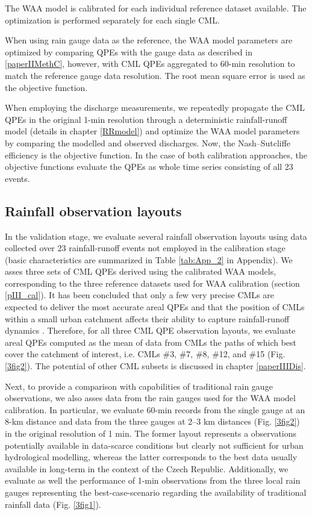 \documentclass{ctuthesis}\usepackage[]{graphicx}\usepackage[]{color}
\begin{document}
The WAA model is calibrated for each individual reference dataset available. The optimization is performed separately for each single CML. 

When using rain gauge data as the reference, the WAA model parameters are optimized by comparing QPEs with the gauge data as described in \ref{paperIIMethC}, however, with CML QPEs aggregated to 60-min resolution to match the reference gauge data resolution. The root mean square error is used as the objective function. 

When employing the discharge measurements, we repeatedly propagate the CML QPEs in the original 1-min resolution through a deterministic rainfall-runoff model (details in chapter \ref{RRmodel}) and optimize the WAA model parameters by comparing the modelled and observed discharges. Now, the Nash–Sutcliffe efficiency is the objective function. In the case of both calibration approaches, the objective functions evaluate the QPEs as whole time series consisting of all 23 events.


\subsection{Rainfall observation layouts} \label{pIII_rainfall_scen}

In the validation stage, we evaluate several rainfall observation layouts using data collected over 23 rainfall-runoff events not employed in the calibration stage (basic characteristics are summarized in Table \ref{tab:App_2} in Appendix). We asses three sets of CML QPEs derived using the calibrated WAA models, corresponding to the three reference datasets used for WAA calibration (section \ref{pIII_cal}). It has been concluded that only a few very precise CMLs are expected to deliver the most accurate areal QPEs \citep{fenclCommercialMicrowaveLinks2015} and that the position of CMLs within a small urban catchment affects their ability to capture rainfall-runoff dynamics \citep[][chapter \ref{chap5}]{pastorekCommercialMicrowaveLinks2019}. Therefore, for all three CML QPE observation layouts, we evaluate areal QPEs computed as the mean of data from CMLs the paths of which best cover the catchment of interest, i.e. CMLs \#3, \#7, \#8, \#12, and \#15 (Fig. \ref{3fig2}). The potential of other CML subsets is discussed in chapter \ref{paperIIIDis}.

Next, to provide a comparison with capabilities of traditional rain gauge observations, we also asses data from the rain gauges used for the WAA model calibration. In particular, we evaluate 60-min records from the single gauge at an 8-km distance and data from the three gauges at 2--3 km distances (Fig. \ref{3fig2}) in the original resolution of 1 min. The former layout represents a observations potentially available in data-scarce conditions but clearly not sufficient for urban hydrological modelling, whereas the latter corresponds to the best data usually available in long-term in the context of the Czech Republic. Additionally, we evaluate as well the performance of 1-min observations from the three local rain gauges representing the best-case-scenario regarding the availability of traditional rainfall data (Fig. \ref{3fig1}).
\end{document}
